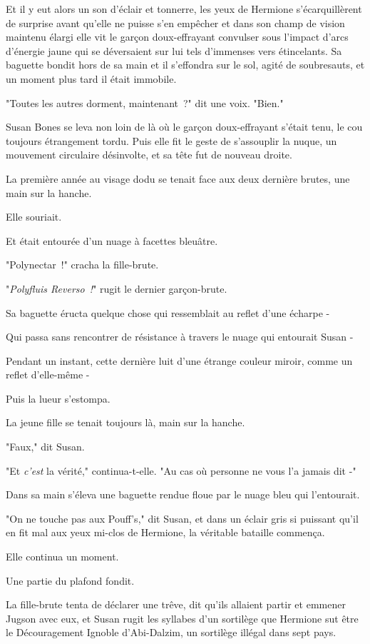 Et il y eut alors un son d'éclair et tonnerre, les yeux de Hermione s'écarquillèrent de surprise avant qu'elle ne puisse s'en empêcher et dans son champ de vision maintenu élargi elle vit le garçon doux-effrayant convulser sous l'impact d'arcs d'énergie jaune qui se déversaient sur lui tels d'immenses vers étincelants. Sa baguette bondit hors de sa main et il s'effondra sur le sol, agité de soubresauts, et un moment plus tard il était immobile.

"Toutes les autres dorment, maintenant~?" dit une voix. "Bien."

Susan Bones se leva non loin de là où le garçon doux-effrayant s'était tenu, le cou toujours étrangement tordu. Puis elle fit le geste de s'assouplir la nuque, un mouvement circulaire désinvolte, et sa tête fut de nouveau droite.

La première année au visage dodu se tenait face aux deux dernière brutes, une main sur la hanche.

Elle souriait.

Et était entourée d'un nuage à facettes bleuâtre.

"Polynectar~!" cracha la fille-brute.

"\emph{Polyfluis Reverso~!}" rugit le dernier garçon-brute.

Sa baguette éructa quelque chose qui ressemblait au reflet d'une écharpe -

Qui passa sans rencontrer de résistance à travers le nuage qui entourait Susan -

Pendant un instant, cette dernière luit d'une étrange couleur miroir, comme un reflet d'elle-même -

Puis la lueur s'estompa.

La jeune fille se tenait toujours là, main sur la hanche.

"Faux," dit Susan.

"Et \emph{c'est} la vérité," continua-t-elle. "Au cas où personne ne vous l'a jamais dit -"

Dans sa main s'éleva une baguette rendue floue par le nuage bleu qui l'entourait.

"On ne touche pas aux Pouff's," dit Susan, et dans un éclair gris si puissant qu'il en fit mal aux yeux mi-clos de Hermione, la véritable bataille commença.

Elle continua un moment.

Une partie du plafond fondit.

La fille-brute tenta de déclarer une trêve, dit qu'ils allaient partir et emmener Jugson avec eux, et Susan rugit les syllabes d'un sortilège que Hermione sut être le Découragement Ignoble d'Abi-Dalzim, un sortilège illégal dans sept pays.

